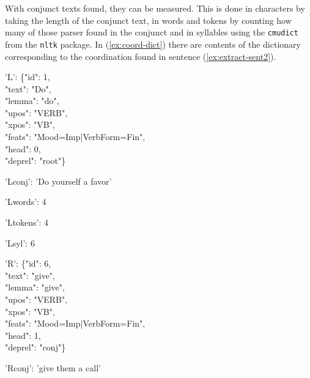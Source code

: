 With conjunct texts found, they can be measured. This is done in characters by taking the length of the conjunct text, in words and tokens by counting how many of those parser found in the conjunct and in syllables using the \texttt{cmudict} from the \texttt{nltk} package. In (\ref{ex:coord-dict}) there are contents of the dictionary corresponding to the coordination found in sentence (\ref{ex:extract-sent2}).

\begin{exe}
\ex\label{ex:coord-dict}
\ttfamily\raggedright\scriptsize
\begin{multicols}{2}
'L': \{"id": 1,\\\hspace{.5cm}
  "text": "Do",\\\hspace{.5cm}
  "lemma": "do",\\\hspace{.5cm}
  "upos": "VERB",\\\hspace{.5cm}
  "xpos": "VB",\\\hspace{.5cm}
  "feats": "Mood=Imp|VerbForm=Fin",\\\hspace{.5cm}
  "head": 0,\\\hspace{.5cm}
  "deprel": "root"\}

'Lconj': 'Do yourself a favor'

'Lwords': 4

'Ltokens': 4

'Lsyl': 6

'R': \{"id": 6,\\\hspace{.5cm}
  "text": "give",\\\hspace{.5cm}
  "lemma": "give",\\\hspace{.5cm}
  "upos": "VERB",\\\hspace{.5cm}
  "xpos": "VB",\\\hspace{.5cm}
  "feats": "Mood=Imp|VerbForm=Fin",\\\hspace{.5cm}
  "head": 1,\\\hspace{.5cm}
  "deprel": "conj"\}

'Rconj': 'give them a call'


\end{multicols}
\end{exe}
